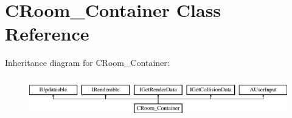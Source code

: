 \hypertarget{classCRoom__Container}{\section{C\-Room\-\_\-\-Container Class Reference}
\label{classCRoom__Container}
}
Inheritance diagram for C\-Room\-\_\-\-Container\-:\begin{figure}[H]
\begin{center}
\leavevmode
\includegraphics[height=1.836066cm]{classCRoom__Container}
\end{center}
\end{figure}

